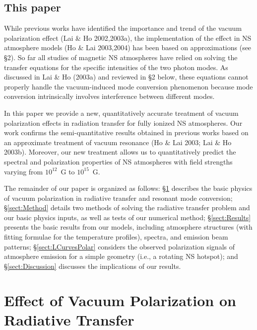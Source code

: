 \documentclass[useAMS,onecolumn,usenatbib,usegraphicx]{mn2e}
\begin{document}
\subsection{This paper}

While previous works have identified 
the importance and trend of the vacuum polarization effect
(Lai \& Ho 2002,2003a), the implementation of
the effect in NS atmosphere models (Ho \& Lai 2003,2004)
has been based on approximations (see \S 2).
So far all studies of magnetic
NS atmospheres have relied on solving the transfer equations for the
specific intensities of the two photon modes.
As discussed in Lai \& Ho (2003a) and reviewed in \S 2 below, 
these equations cannot properly handle the vacuum-induced mode conversion
phenomenon because mode conversion intrinsically involves 
interference between different modes.

In this paper we provide a new, quantitatively accurate 
treatment of vacuum polarization effects in radiation transfer for 
fully ionized NS atmospheres. Our work confirms
the semi-quantitative results obtained in 
previous works based on an approximate treatment of vacuum resonance
(Ho \& Lai 2003; Lai \& Ho 2003b). Moreover, our new 
treatment allows us to quantitatively predict the spectral and
polarization properties of NS atmospheres with field strengths varying
from $10^{12}$~G to $10^{15}$~G.
 
The remainder of our paper is organized as follows: \S\ref{sect:VacEffect}
describes the basic physics of vacuum polarization in radiative
transfer and resonant mode conversion; \S\ref{sect:Method} details two
methods of solving the radiative transfer problem and our basic
physics inputs, as well as tests of our numerical method;
\S\ref{sect:Results} presents the basic results from our models, including 
atmosphere structures (with fitting formulae for the temperature profiles), 
spectra, and emission beam patterns;
\S\ref{sect:LCurvesPolar} considers the observed 
polarization signals of atmosphere emission for a simple geometry 
(i.e., a rotating NS hotspot); and
\S\ref{sect:Discussion} discusses the implications of our results.


\section{Effect of Vacuum Polarization on Radiative Transfer}
\label{sect:VacEffect}
\end{document}
